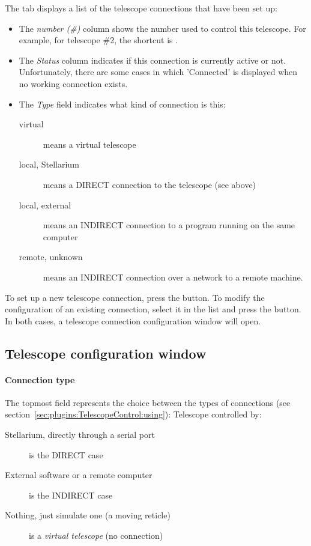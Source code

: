 \noindent The  tab displays a list of the telescope connections that have been set up:

\begin{itemize}
\item The \emph{number (\#)} column shows the number used to control this
  telescope. For example, for telescope \#2, the shortcut is
  .
\item The \emph{Status} column indicates if this connection is
  currently active or not. Unfortunately, there are some cases in
  which 'Connected' is displayed when no working connection exists.
\item The \emph{Type} field indicates what kind of connection is this:
  \begin{description}
  \item[virtual] means a virtual telescope
  \item[local, Stellarium] means a
    DIRECT connection to the telescope (see above)
  \item[local, external] means an INDIRECT connection to a program
    running on the same computer
  \item[remote, unknown] means an INDIRECT connection over a network
    to a remote machine.
  \end{description}
\end{itemize}

\noindent To set up a new telescope connection, press the  button. To modify
the configuration of an existing connection, select it in the list and
press the  button. In both cases, a telescope connection
configuration window will open.



\subsection{Telescope configuration window}

\paragraph{Connection type}
The topmost field represents the choice between the types of connections (see section~\ref{sec:plugins:TelescopeControl:using}):
Telescope controlled by:
\begin{description}
\item[Stellarium, directly through a serial port] is the DIRECT case
\item[External software or a remote computer] is the INDIRECT case
\item[Nothing, just simulate one (a moving reticle)] is a \emph{virtual telescope} (no connection)
\end{description}

